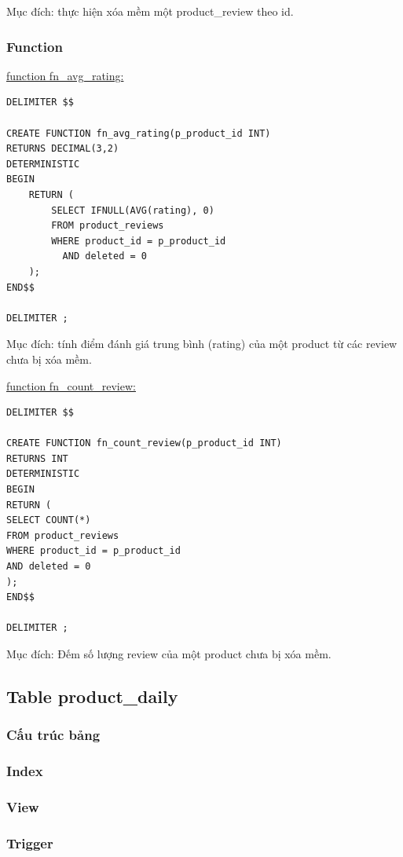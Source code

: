 Mục đích: thực hiện xóa mềm một product\_review theo id.

\subsubsection{Function}

\underline{function fn\_avg\_rating:}

\begin{verbatim}
DELIMITER $$

CREATE FUNCTION fn_avg_rating(p_product_id INT)
RETURNS DECIMAL(3,2)
DETERMINISTIC
BEGIN
    RETURN (
        SELECT IFNULL(AVG(rating), 0)
        FROM product_reviews
        WHERE product_id = p_product_id
          AND deleted = 0
    );
END$$

DELIMITER ;
\end{verbatim}

Mục đích: tính điểm đánh giá trung bình (rating) của một product từ các review chưa bị xóa mềm.

\underline{function fn\_count\_review:}

\begin{verbatim}
DELIMITER $$

CREATE FUNCTION fn_count_review(p_product_id INT)
RETURNS INT
DETERMINISTIC
BEGIN
RETURN (
SELECT COUNT(*)
FROM product_reviews
WHERE product_id = p_product_id
AND deleted = 0
);
END$$

DELIMITER ;
\end{verbatim}

Mục đích: Đếm số lượng review của một product chưa bị xóa mềm.

\subsection{Table product\_daily}

\subsubsection{Cấu trúc bảng}

\subsubsection{Index}

\subsubsection{View}

\subsubsection{Trigger}

